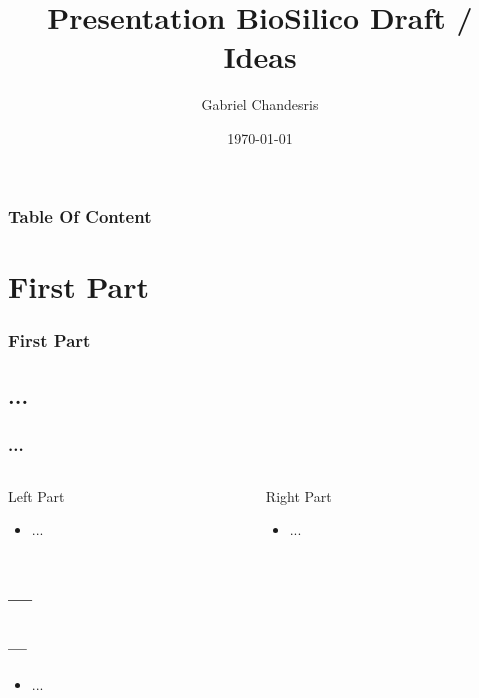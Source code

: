 \documentclass{beamer}
\title[Presentation BioSilico Draft / Ideas]{Presentation BioSilico Draft / Ideas}
\author{Gabriel Chandesris}
\institute{ \texttt{[image: ../img/logo\_glider.png]} }
\date{\today } %
\begin{document}
\begin{frame}
	\titlepage
\end{frame}

\begin{frame}
	\frametitle{Table Of Content}
	\small \tableofcontents[hideallsubsections]
\end{frame} 

\def\titleSectionFirstPart{First Part}
\section{\titleSectionFirstPart }
\begin{frame}
	\frametitle{\titleSectionFirstPart }
	\tableofcontents[sections=1,currentsection,subsectionstyle=show/shaded/hide]
\end{frame} 

\def\titleSubSectionPartOne{ ... }
\subsection{ \titleSubSectionPartOne }
\begin{frame}
	\frametitle{ \titleSubSectionPartOne }
	\begin{columns}[T]
	\begin{column}[T]{6.0cm}
		\begin{block}{Left Part}
			\begin{itemize}
				\item ...
			\end{itemize}
		\end{block}
	\end{column}
	\begin{column}[T]{5.0cm}
		\begin{block}{Right Part}
			\begin{itemize}
				\item ...
			\end{itemize}
		\end{block}
	\end{column}
	\end{columns}
\end{frame} 

\def\titleSubSectionPartTwo{ --- }
\subsection{ \titleSubSectionPartTwo }
\begin{frame}
	\frametitle{ \titleSubSectionPartTwo }
	\begin{itemize}
		\item ...
	\end{itemize}
\end{frame}
\end{document}
